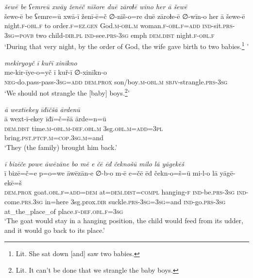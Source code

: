\ea \label{ZB.24}
\textit{šewē be ʕemreū xwāy ženēč nīšore duē zāroɫē wīno her ā šewē} \\ 
\gll šewe-ē be ʕemre=ū xwā-ī ženī-ē=č ∅-nīš-o=re duē zāroɫe-ē ∅-wīn-o her ā šewe-ē \\ 
 night\textsc{.f}\textsc{-obl}\textsc{.f} to order\textsc{.f}\textsc{\textsc{=ez.gen}} God\textsc{.m}\textsc{-obl}\textsc{.m} woman\textsc{.f}\textsc{-obl}\textsc{.f}\textsc{=add} \textsc{ind-}sit\textsc{.prs}\textsc{-3sg}\textsc{=\textsc{povb}} two child\textsc{-dir}\textsc{.pl} \textsc{ind-}see\textsc{.prs}\textsc{-3sg} emph \textsc{dem.dist} night\textsc{.f}\textsc{-obl}\textsc{.f} \\ 
\glt `During that very night, by the order of God, the wife gave birth to two babies.\footnote{Lit. She sat down [and] saw two babies.} '
\z 
 
\ea \label{ZB.35}
\textit{mekiryoyč ī kuřī xinīkno} \\ 
\gll me-kir-īye-o=yč ī kuř-ī ∅-xinīkn-o \\ 
 \textsc{neg-}do.pass-pass\textsc{-3sg}\textsc{=add} \textsc{dem.prox} son/boy\textsc{.m}\textsc{-obl}\textsc{.m} \textsc{sbjv}-strangle\textsc{.prs}\textsc{-3sg} \\ 
\glt `We should not strangle the [baby] boys.\footnote{Lit. It can't be done that we strangle the baby boys.}'
\z 
 
\ea \label{ZB.50}
\textit{ā wextīekey īđīčšā ārdenū} \\ 
\gll ā wext-ī-ekey īđī=č=šā ārde=n=ū \\ 
 \textsc{dem.dist} time\textsc{.m}\textsc{-obl}\textsc{.m}\textsc{-def}\textsc{.obl}\textsc{.m} 3sg\textsc{.obl}\textsc{.m}\textsc{=add}\textsc{=3pl} bring\textsc{.pst}\textsc{.ptcp}\textsc{.m}\textsc{=cop}\textsc{.3sg}\textsc{.m}=and \\ 
\glt `They (the family) brought him back.'
\z 
 
\ea \label{ZB.54}
\textit{ī bizēče powe āwēzāne bo mē e čē ēđ čeknošū milo lā yāgekēš} \\ 
\gll ī bizē=č=e p=o=we āwēzān-e ∅-b-o m-ē e=čē ēđ čekn-o=š=ū mi-l-o lā yāgē-ekē=š \\ 
 \textsc{dem.prox} goat\textsc{.obl}\textsc{.f}\textsc{=add}\textsc{=dem} at=\textsc{dem.dist}\textsc{=compl} hanging\textsc{-f} \textsc{ind-}be\textsc{.prs}\textsc{-3sg} \textsc{ind-}come\textsc{.prs}\textsc{.3sg} in=here 3sg.prox\textsc{.dir} suckle\textsc{.prs}\textsc{-3sg}\textsc{=3sg}=and \textsc{ind-}go\textsc{.prs}\textsc{-3sg} at\_the\_place\_of place\textsc{.f}\textsc{-def}\textsc{.obl}\textsc{.f}\textsc{=3sg} \\ 
\glt `The goat would stay in a hanging position, the child would feed from its udder, and it would go back to its place.'
\z 
 

